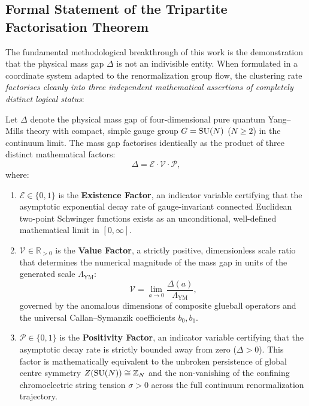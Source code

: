 \subsection{Formal Statement of the Tripartite Factorisation Theorem}
\label{subsec:tripartite_statement}

The fundamental methodological breakthrough of this work is the demonstration that the physical mass gap $\Delta$ is not an indivisible entity. When formulated in a coordinate system adapted to the renormalization group flow, the clustering rate \emph{factorises cleanly into three independent mathematical assertions of completely distinct logical status}:

\begin{theorem}
\label{thm:factorisation_theorem}
Let $\Delta$ denote the physical mass gap of four-dimensional pure quantum Yang--Mills theory with compact, simple gauge group $G = \mathrm{SU}(N)$ ($N \ge 2$) in the continuum limit. The mass gap factorises identically as the product of three distinct mathematical factors:
\begin{equation}
\label{eq:factorisation_formula}
\Delta = \mathcal{E} \cdot \mathcal{V} \cdot \mathcal{P},
\end{equation}
where:
\begin{enumerate}
    \item $\mathcal{E} \in \{0, 1\}$ is the \textbf{Existence Factor}, an indicator variable certifying that the asymptotic exponential decay rate of gauge-invariant connected Euclidean two-point Schwinger functions exists as an unconditional, well-defined mathematical limit in $[0, \infty]$.
    \item $\mathcal{V} \in \mathbb{R}_{>0}$ is the \textbf{Value Factor}, a strictly positive, dimensionless scale ratio that determines the numerical magnitude of the mass gap in units of the generated scale $\Lambda_{\mathrm{YM}}$:
    \begin{equation}
    \label{eq:value_factor_def_ch8}
    \mathcal{V} = \lim_{a \to 0} \frac{\Delta(a)}{\Lambda_{\mathrm{YM}}},
    \end{equation}
    governed by the anomalous dimensions of composite glueball operators and the universal Callan--Symanzik coefficients $b_0, b_1$.
    \item $\mathcal{P} \in \{0, 1\}$ is the \textbf{Positivity Factor}, an indicator variable certifying that the asymptotic decay rate is strictly bounded away from zero ($\Delta > 0$). This factor is mathematically equivalent to the unbroken persistence of global centre symmetry $Z(\mathrm{SU}(N)) \cong \mathbb{Z}_N$ and the non-vanishing of the confining chromoelectric string tension $\sigma > 0$ across the full continuum renormalization trajectory.
\end{enumerate}
\end{theorem}

